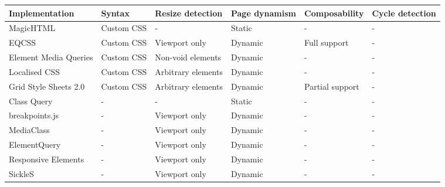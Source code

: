 \documentclass{llncs}
\begin{document}
  \begin{table*}[ht!]\center
    \tiny
    \begin{tabular}[t]{ p{3cm} l l l l l }
      Implementation & Syntax & Resize detection & Page dynamism  & Composability & Cycle detection \\
      \hline
       MagicHTML \cite{eq_imp_magichtml}                          &                       Custom CSS  &   - &                             Static &     -                  & -  \\
       EQCSS \cite{eq_imp_eqcss}                                  &                       Custom CSS  &   Viewport only &                 Dynamic &    Full support       & -  \\
       Element Media Queries \cite{eq_imp_prollyfill-min-width}   &                       Custom CSS  &   Non-void elements &             Dynamic &    -                  & -  \\
       Localised CSS \cite{eq_imp_localised-css}                  &                       Custom CSS  &   Arbitrary elements &            Dynamic &    -                  & -  \\
       Grid Style Sheets 2.0 \cite{eq_imp_gss}                    &                       Custom CSS  &   Arbitrary elements &            Dynamic &    Partial support    & -  \\
       Class Query \cite{eq_imp_classquery}                       &                                 - &   - &                             Static &     -                  & -  \\
       breakpoints.js \cite{eq_imp_breakpointsjs}                 &                                 - &   Viewport only &                 Dynamic &    -                  & -  \\
       MediaClass \cite{eq_imp_mediaclass}                        &                                 - &   Viewport only &                 Dynamic &    -                  & -  \\
       ElementQuery \cite{eq_imp_elementquery}                    &                                 - &   Viewport only &                 Dynamic &    -                  & -  \\
       Responsive Elements \cite{eq_imp_responsive-elements}      &                                 - &   Viewport only &                 Dynamic &    -                  & -  \\
       SickleS \cite{eq_imp_sickles}                              &                                 - &   Viewport only &                 Dynamic &    -                  & -  \\

\end{tabular}
\end{table*}
\end{document}
